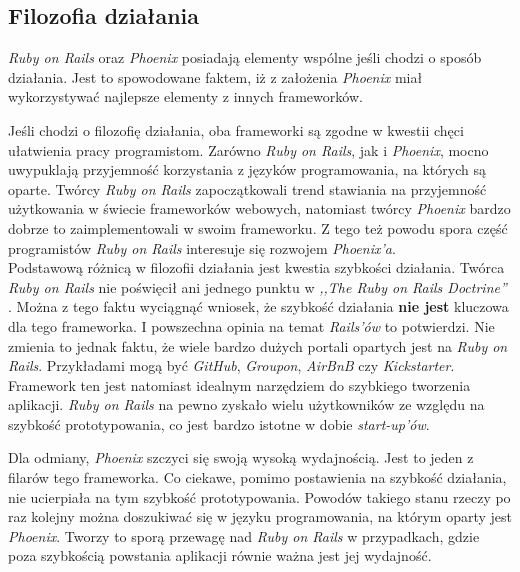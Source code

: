 \documentclass[mgr,oneside]{mgr}
\begin{document}

\subsection{Filozofia działania}
\textit{Ruby on Rails} oraz \textit{Phoenix} posiadają elementy wspólne jeśli chodzi o sposób działania. Jest to spowodowane faktem, iż z założenia \textit{Phoenix} miał wykorzystywać najlepsze elementy z innych frameworków.

Jeśli chodzi o filozofię działania, oba frameworki są zgodne w kwestii chęci ułatwienia pracy programistom. Zarówno \textit{Ruby on Rails}, jak i \textit{Phoenix}, mocno uwypuklają przyjemność korzystania z języków programowania, na których są oparte. Twórcy \textit{Ruby on Rails} zapoczątkowali trend stawiania na przyjemność użytkowania w świecie frameworków webowych, natomiast twórcy \textit{Phoenix} bardzo dobrze to zaimplementowali w swoim frameworku. Z tego też powodu spora część programistów \textit{Ruby on Rails} interesuje się rozwojem \textit{Phoenix'a}.\\

Podstawową różnicą w filozofii działania jest kwestia szybkości działania. Twórca \textit{Ruby on Rails} nie poświęcił ani jednego punktu w \emph{,,The Ruby on Rails Doctrine''} \cite{rails_doctrine}. Można z tego faktu wyciągnąć wniosek, że szybkość działania \textbf{nie jest} kluczowa dla tego frameworka. I powszechna opinia na temat \textit{Rails'ów} to potwierdzi. Nie zmienia to jednak faktu, że wiele bardzo dużych portali opartych jest na \textit{Ruby on Rails}. Przykładami mogą być \textit{GitHub}, \textit{Groupon}, \textit{AirBnB} czy \textit{Kickstarter}. Framework ten jest natomiast idealnym narzędziem do szybkiego tworzenia aplikacji. \textit{Ruby on Rails} na pewno zyskało wielu użytkowników ze względu na szybkość prototypowania, co jest bardzo istotne w dobie \textit{start-up'ów}.

Dla odmiany, \textit{Phoenix} szczyci się swoją wysoką wydajnością. Jest to jeden z filarów tego frameworka. Co ciekawe, pomimo postawienia na szybkość działania, nie ucierpiała na tym szybkość prototypowania. Powodów takiego stanu rzeczy po raz kolejny można doszukiwać się w języku programowania, na którym oparty jest \textit{Phoenix}. Tworzy to sporą przewagę nad \textit{Ruby on Rails} w przypadkach, gdzie poza szybkością powstania aplikacji równie ważna jest jej wydajność.
\end{document}
